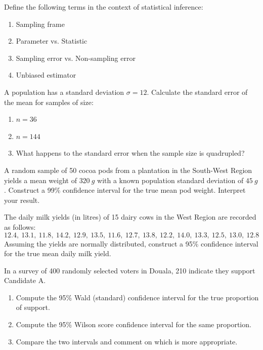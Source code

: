 \documentclass[11pt]{article}
\newcounter{popsec}
\newcounter{popsub}
\newcommand{\courssub}[1]{%
  \stepcounter{popsub}%
  \par\vspace{9pt}\noindent{\popxbold\fontsize{11.5}{13}\selectfont\color{popink}{\color{poporange}\thepopsec.\thepopsub}\hspace{6pt}#1}\par\nopagebreak\vspace{4pt}
}
\begin{document}
\begin{exercice}
Define the following terms in the context of statistical inference:
\begin{enumerate}
\item Sampling frame
\item Parameter vs. Statistic
\item Sampling error vs. Non-sampling error
\item Unbiased estimator
\end{enumerate}
\end{exercice}

\begin{exercice}
A population has a standard deviation $\sigma = 12$. Calculate the standard error of the mean for samples of size:
\begin{enumerate}
\item $n = 36$
\item $n = 144$
\item What happens to the standard error when the sample size is quadrupled?
\end{enumerate}
\end{exercice}

\courssub{I practise}

\begin{exercice}
A random sample of 50 cocoa pods from a plantation in the South-West Region yields a mean weight of $\SI{320}{g}$ with a known population standard deviation of $\SI{45}{g}$. Construct a 99\% confidence interval for the true mean pod weight. Interpret your result.
\end{exercice}

\begin{exercice}
The daily milk yields (in litres) of 15 dairy cows in the West Region are recorded as follows:
\[ 12.4,\ 13.1,\ 11.8,\ 14.2,\ 12.9,\ 13.5,\ 11.6,\ 12.7,\ 13.8,\ 12.2,\ 14.0,\ 13.3,\ 12.5,\ 13.0,\ 12.8 \]
Assuming the yields are normally distributed, construct a 95\% confidence interval for the true mean daily milk yield.
\end{exercice}

\begin{exercice}
In a survey of 400 randomly selected voters in Douala, 210 indicate they support Candidate A.
\begin{enumerate}
\item Compute the 95\% Wald (standard) confidence interval for the true proportion of support.
\item Compute the 95\% Wilson score confidence interval for the same proportion.
\item Compare the two intervals and comment on which is more appropriate.
\end{enumerate}
\end{exercice}
\end{document}
